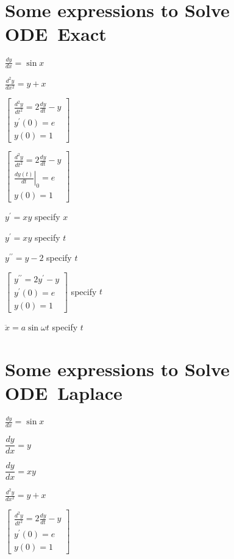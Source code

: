 \documentclass{article}
\begin{document}
\section{Some expressions to Solve ODE\ Exact}

$\frac{dy}{dx}=\sin x$

$\frac{d^{2}y}{dx^{2}}=y+x$

$\left[ 
\begin{array}{c}
\frac{d^{2}y}{dt^{2}}=2\frac{dy}{dt}-y \\ 
y^{\prime }\left( 0\right) =e \\ 
y\left( 0\right) =1%
\end{array}%
\right] $

$\left[ 
\begin{array}{c}
\frac{d^{2}y}{dt^{2}}=2\frac{dy}{dt}-y \\ 
\left. \frac{dy\left( t\right) }{dt}\right\vert _{0}=e \\ 
y\left( 0\right) =1%
\end{array}%
\right] $

$y^{\prime }=xy$ specify $x$

$y^{\prime }=xy$ specify $t$

$y^{\prime \prime }=y-2$ specify $t$

$\left[ 
\begin{array}{c}
y^{\prime \prime }=2y^{\prime }-y \\ 
y^{\prime }\left( 0\right) =e \\ 
y\left( 0\right) =1%
\end{array}%
\right] $ specify $t$

$\ddot{x}=a\sin \omega t$ specify $t$

\section{Some expressions to Solve ODE\ Laplace}

$\frac{dy}{dx}=\sin x$

$\dfrac{dy}{dx}=y$

$\dfrac{dy}{dx}=xy$

$\frac{d^{2}y}{dx^{2}}=y+x$

$\left[ 
\begin{array}{c}
\frac{d^{2}y}{dt^{2}}=2\frac{dy}{dt}-y \\ 
y^{\prime }\left( 0\right) =e \\ 
y\left( 0\right) =1%
\end{array}%
\right] $
\end{document}
